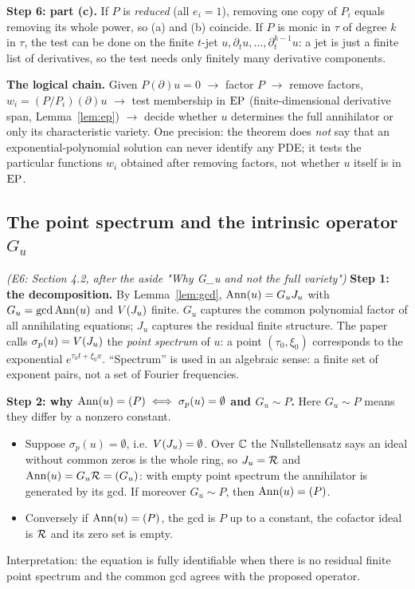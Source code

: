 \medskip\textbf{Step 6: part (c).} If $P$ is \emph{reduced} (all $e_i=1$), removing one copy of $P_i$ equals removing its whole power, so (a) and (b) coincide. If $P$ is monic in $\tau$ of degree $k$ in $\tau$, the test can be done on the finite $t$-jet $u,\partial_tu,\dots,\partial_t^{k-1}u$: a jet is just a finite list of derivatives, so the test needs only finitely many derivative components.

\medskip\textbf{The logical chain.} Given $P(\partial)u=0$ $\to$ factor $P$ $\to$ remove factors, $w_i=(P/P_i)(\partial)u$ $\to$ test membership in $\mathrm{EP}$ (finite-dimensional derivative span, Lemma~\ref{lem:ep}) $\to$ decide whether $u$ determines the full annihilator or only its characteristic variety. One precision: the theorem does \emph{not} say that an exponential-polynomial solution can never identify any PDE; it tests the particular functions $w_i$ obtained after removing factors, not whether $u$ itself is in $\mathrm{EP}$.

\subsection{The point spectrum and the intrinsic operator $G_u$}\label{expl:E6}
\noindent\emph{(E6: Section 4.2, after the aside "Why G\_u and not the full variety")}
\textbf{Step 1: the decomposition.} By Lemma~\ref{lem:gcd}, $\operatorname{Ann}(u)=G_uJ_u$ with $G_u=\operatorname{gcd}\operatorname{Ann}(u)$ and $V(J_u)$ finite. $G_u$ captures the common polynomial factor of all annihilating equations; $J_u$ captures the residual finite structure. The paper calls $\sigma_p(u)=V(J_u)$ the \emph{point spectrum} of $u$: a point $(\tau_0,\xi_0)$ corresponds to the exponential $e^{\tau_0t+\xi_0x}$. ``Spectrum'' is used in an algebraic sense: a finite set of exponent pairs, not a set of Fourier frequencies.

\medskip\textbf{Step 2: why $\operatorname{Ann}(u)=(P)\iff\sigma_p(u)=\emptyset$ and $G_u\sim P$.} Here $G_u\sim P$ means they differ by a nonzero constant.
\begin{itemize}[nosep]
\item Suppose $\sigma_p(u)=\emptyset$, i.e.\ $V(J_u)=\emptyset$. Over $\mathbb{C}$ the Nullstellensatz says an ideal without common zeros is the whole ring, so $J_u=\mathcal{R}$ and $\operatorname{Ann}(u)=G_u\mathcal{R}=(G_u)$: with empty point spectrum the annihilator is generated by its gcd. If moreover $G_u\sim P$, then $\operatorname{Ann}(u)=(P)$.
\item Conversely if $\operatorname{Ann}(u)=(P)$, the gcd is $P$ up to a constant, the cofactor ideal is $\mathcal{R}$ and its zero set is empty.
\end{itemize}
Interpretation: the equation is fully identifiable when there is no residual finite point spectrum and the common gcd agrees with the proposed operator.

